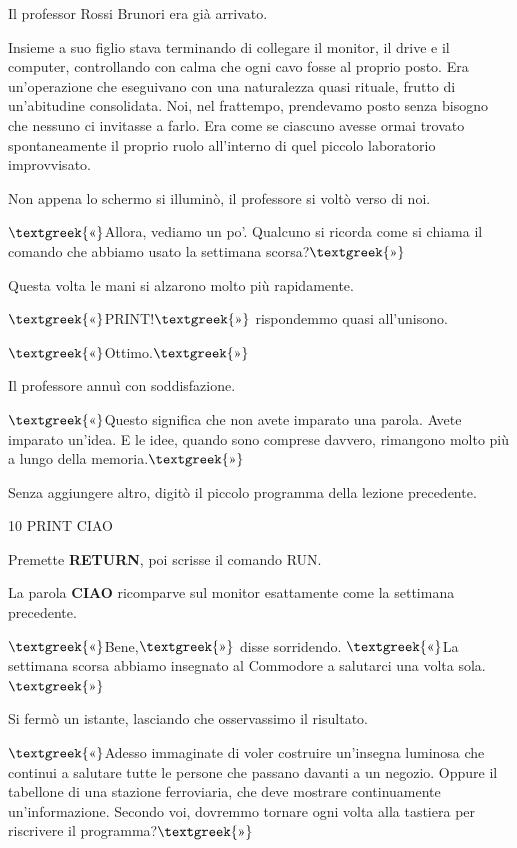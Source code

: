 \documentclass{article}
\begin{document}
Il professor Rossi Brunori era già arrivato.

Insieme a suo figlio stava terminando di collegare il monitor, il drive e il computer, controllando con calma che ogni
cavo fosse al proprio posto. Era un'operazione che eseguivano con una naturalezza quasi rituale, frutto di un'abitudine
consolidata. Noi, nel frattempo, prendevamo posto senza bisogno che nessuno ci invitasse a farlo. Era come se ciascuno
avesse ormai trovato spontaneamente il proprio ruolo all'interno di quel piccolo laboratorio improvvisato.

Non appena lo schermo si illuminò, il professore si voltò verso di noi.

$\text{\textgreek{«}}$Allora, vediamo un po'. Qualcuno si ricorda come si chiama il comando che abbiamo usato la
settimana scorsa?$\text{\textgreek{»}}$

Questa volta le mani si alzarono molto più rapidamente.

$\text{\textgreek{«}}$PRINT!$\text{\textgreek{»}}$ rispondemmo quasi all'unisono.

$\text{\textgreek{«}}$Ottimo.$\text{\textgreek{»}}$

Il professore annuì con soddisfazione.

$\text{\textgreek{«}}$Questo significa che non avete imparato una parola. Avete imparato un'idea. E le idee, quando sono
comprese davvero, rimangono molto più a lungo della memoria.$\text{\textgreek{»}}$

Senza aggiungere altro, digitò il piccolo programma della lezione precedente.

10 PRINT {\textquotedbl}CIAO{\textquotedbl}

Premette \textbf{RETURN}, poi scrisse il comando RUN.

La parola \textbf{CIAO} ricomparve sul monitor esattamente come la settimana precedente.

$\text{\textgreek{«}}$Bene,$\text{\textgreek{»}}$ disse sorridendo. $\text{\textgreek{«}}$La settimana scorsa abbiamo
insegnato al Commodore a salutarci una volta sola.$\text{\textgreek{»}}$

Si fermò un istante, lasciando che osservassimo il risultato.

$\text{\textgreek{«}}$Adesso immaginate di voler costruire un'insegna luminosa che continui a salutare tutte le persone
che passano davanti a un negozio. Oppure il tabellone di una stazione ferroviaria, che deve mostrare continuamente
un'informazione. Secondo voi, dovremmo tornare ogni volta alla tastiera per riscrivere il
programma?$\text{\textgreek{»}}$
\end{document}
